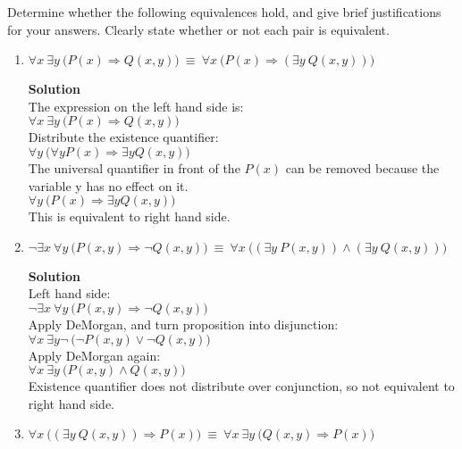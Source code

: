 \documentclass[11pt]{article}
\newenvironment{Parts}{\begin{enumerate}[label=(\alph*)]}{\end{enumerate}}
\newcommand*{\Part}{\item}
\begin{document}
Determine whether the following equivalences hold, and give brief justifications for your answers. Clearly state whether or not each pair is equivalent.
\begin{Parts}

\Part $\forall x~\exists y~\big(P(x)\Rightarrow Q(x,y)\big)~\equiv~\forall x~\big(P(x)\Rightarrow(\exists y~Q(x,y))\big)$

\begin{mdframed} \textbf{Solution} \\
The expression on the left hand side is: \\
$\forall x~\exists y~\big(P(x)\Rightarrow Q(x,y)\big)$ \\
Distribute the existence quantifier: \\
$\forall y~\big(\forall y P(x)\Rightarrow \exists y Q(x,y)\big)$ \\
The universal quantifier in front of the $P(x)$ can be removed because the variable y has no effect on it. \\
$\forall y~\big(P(x)\Rightarrow \exists y Q(x,y)\big)$ \\
This is equivalent to right hand side.

\end{mdframed}

\Part $\neg\exists x~\forall y~\big(P(x,y)\Rightarrow\neg Q(x,y)\big)~\equiv~\forall x~\big( (\exists y~P(x,y)) \land (\exists y~Q(x,y)) \big)$

\begin{mdframed} \textbf{Solution} \\
Left hand side: \\
$\neg\exists x~\forall y~\big(P(x,y)\Rightarrow\neg Q(x,y)\big)$ \\
Apply DeMorgan, and turn proposition into disjunction: \\
$\forall x~\exists y \neg ~\big(\neg P(x,y)\lor\neg Q(x,y)\big)$ \\
Apply DeMorgan again: \\
$\forall x~\exists y ~\big(P(x,y)\land Q(x,y)\big)$ \\
Existence quantifier does not distribute over conjunction, so not equivalent to right hand side.
\end{mdframed}

\Part $\forall x~\big((\exists y~Q(x,y))\Rightarrow P(x)\big)~\equiv~\forall x~\exists y~\big(Q(x,y)\Rightarrow P(x)\big)$


\end{Parts}
\end{document}
